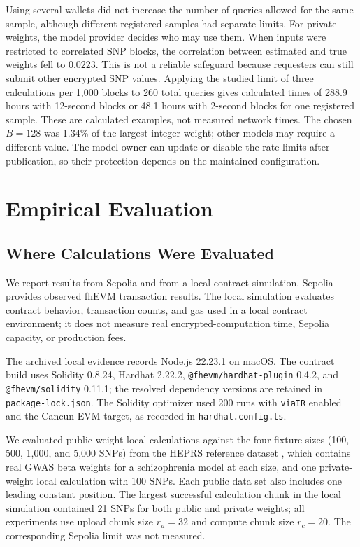 \documentclass[10pt]{article}
\begin{document}
Using several wallets did not increase the number of queries allowed for the same
sample, although different registered samples had separate limits.  For private
weights, the model provider decides who may use them.  When inputs were restricted to
correlated SNP blocks, the correlation between estimated and true weights fell to
$0.0223$.  This is not a reliable safeguard because requesters can still submit other
encrypted SNP values. Applying the studied limit of three calculations per 1,000 blocks
to 260 total queries gives calculated times of 288.9 hours with 12-second blocks or
48.1 hours with 2-second blocks for one registered sample. These are calculated examples,
not measured network times. The chosen $B=128$ was 1.34\% of the largest integer weight;
other models may require a different value.  The model owner can update or disable the
rate limits after publication, so their protection depends on the maintained configuration.

\section{Empirical Evaluation}
\label{sec:evaluation}

\subsection{Where Calculations Were Evaluated}

We report results from Sepolia and from a local contract simulation.  Sepolia provides
observed fhEVM transaction results.  The local simulation evaluates contract behavior,
transaction counts, and gas used in a local contract environment; it does not measure
real encrypted-computation time, Sepolia capacity, or production fees.

The archived local evidence records Node.js 22.23.1 on macOS.  The contract build uses
Solidity 0.8.24, Hardhat 2.22.2, \texttt{@fhevm/hardhat-plugin} 0.4.2, and
\texttt{@fhevm/solidity} 0.11.1; the resolved dependency versions are retained in
\texttt{package-lock.json}.  The Solidity optimizer used 200 runs with \texttt{viaIR}
enabled and the Cancun EVM target, as recorded in \texttt{hardhat.config.ts}.

We evaluated public-weight local calculations against the four fixture sizes (100, 500,
1,000, and 5,000 SNPs) from the HEPRS reference dataset \citep{knight2026heprs}, which
contains real GWAS beta weights for a schizophrenia model at each size, and one
private-weight local calculation with 100 SNPs.  Each
public data set also includes one leading constant position.  The largest successful calculation
chunk in the local simulation contained 21 SNPs for both public and private weights; all
experiments use upload chunk size $r_u = 32$ and compute chunk size $r_c = 20$.  The
corresponding Sepolia limit was not measured.
\end{document}
